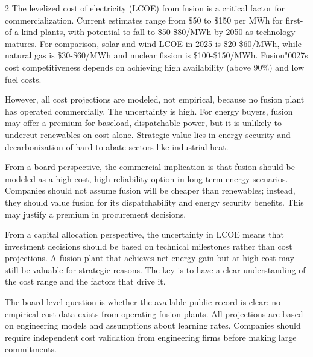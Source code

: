\documentclass[10pt,a4paper]{article}
\newcommand{\BOApos}{{\BOQuoteFont\char"0027}}
\begin{document}
\begin{multicols}{2}
{\small The levelized cost of electricity (LCOE) from fusion is a critical factor for commercialization. Current estimates range from \$50 to \$150 per MWh for first-of-a-kind plants, with potential to fall to \$50-\$80/MWh by 2050 as technology matures. For comparison, solar and wind LCOE in 2025 is \$20-\$60/MWh, while natural gas is \$30-\$60/MWh and nuclear fission is \$100-\$150/MWh. Fusion\BOApos{}s cost competitiveness depends on achieving high availability (above 90\%) and low fuel costs.}\par
{\small However, all cost projections are modeled, not empirical, because no fusion plant has operated commercially. The uncertainty is high. For energy buyers, fusion may offer a premium for baseload, dispatchable power, but it is unlikely to undercut renewables on cost alone. Strategic value lies in energy security and decarbonization of hard-to-abate sectors like industrial heat.}\par
{\small From a board perspective, the commercial implication is that fusion should be modeled as a high-cost, high-reliability option in long-term energy scenarios. Companies should not assume fusion will be cheaper than renewables; instead, they should value fusion for its dispatchability and energy security benefits. This may justify a premium in procurement decisions.}\par
{\small From a capital allocation perspective, the uncertainty in LCOE means that investment decisions should be based on technical milestones rather than cost projections. A fusion plant that achieves net energy gain but at high cost may still be valuable for strategic reasons. The key is to have a clear understanding of the cost range and the factors that drive it.}\par
{\small The board-level question is whether the available public record is clear: no empirical cost data exists from operating fusion plants. All projections are based on engineering models and assumptions about learning rates. Companies should require independent cost validation from engineering firms before making large commitments.}\par
\end{multicols}
\label{chap:3:end}
\end{document}
